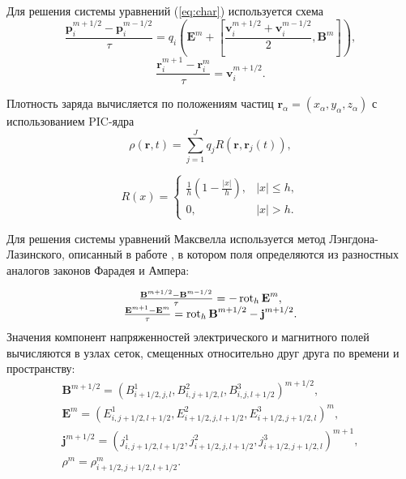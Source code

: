 Для решения системы уравнений (\ref{eq:char}) используется схема
$$
\frac{{\textbf{p}}^{m+1/2}_{i}-{\textbf{p}}^{m-1/2}_{i}}{\tau}=q_{i}\left({\textbf{E}}^m+\left[\frac{{\textbf{v}}^{m+1/2}_{i}+{\textbf{v}}^{m-1/2}_{i}}{2},{\textbf{B}}^m \right] \right),
$$
$$
\frac{{\textbf{r}}_{i}^{m+1}-{\textbf{r}}_{i}^{m}}{\tau}={\textbf{v}}^{m+1/2}_{i}.
$$


Плотность заряда вычисляется по положениям частиц ${\textbf{r}}_\alpha=(x_\alpha,y_\alpha,z_\alpha)$ с использованием PIC-ядра 
$$
\rho({\textbf{r}}, t)=\sum_{j=1}^J q_{j} R({\textbf{r}}, {\textbf{r}}_{j}(t)),
$$

\begin{equation}
R(x)=\left\{
\begin{array}{ll}
\displaystyle \frac{1}{h}\left(1-\frac{|x|}{h}\right), & |x|\leq h, \\ 0, & |x|>h.
\end{array} \right.
\end{equation}

Для решения системы уравнений Максвелла используется метод Лэнгдона-Лазинского, описанный в работе \cite{lasin}, в котором поля определяются из разностных аналогов законов Фарадея и Ампера:

\begin{equation}
\begin{array}{c}
\frac{{\textbf{B}}^{m+1/2}-{\textbf{B}}^{m-1/2}}{\tau}=-\mathop{\mathrm{rot}}\nolimits_h {\textbf{E}}^m,
\\
\frac{{\textbf{E}}^{m+1}-{\textbf{E}}^m}{\tau}=\mathop{\mathrm{rot}}\nolimits_h {\textbf{B}}^{m+1/2} - {\textbf{j}}^{m+1/2}.
\end{array}
\end{equation}
Значения компонент напряженностей электрического и магнитного полей вычисляются в узлах сеток, смещенных относительно друг друга по времени и пространству:
\begin{equation}
\label{eq:BE}
\begin{array}{c}


{\textbf{B}}^{m+1/2}=(B^1_{i+1/2,j,l}, B^2_{i,j+1/2,l}, B^3_{i,j,l+1/2})^{m+1/2},
\\
{\textbf{E}}^{m}=(E^1_{i,j+1/2,l+1/2}, E^2_{i+1/2,j,l+1/2}, E^3_{i+1/2,j+1/2,l})^m,
\\
{\textbf{j}}^{m+1/2}=(j^1_{i,j+1/2,l+1/2},j^2_{i+1/2,j,l+1/2},j^3_{i+1/2,j+1/2,l})^{m+1},
\\
\rho^m=\rho^m_{i+1/2,j+1/2,l+1/2}. 
\end{array}
\end{equation}

